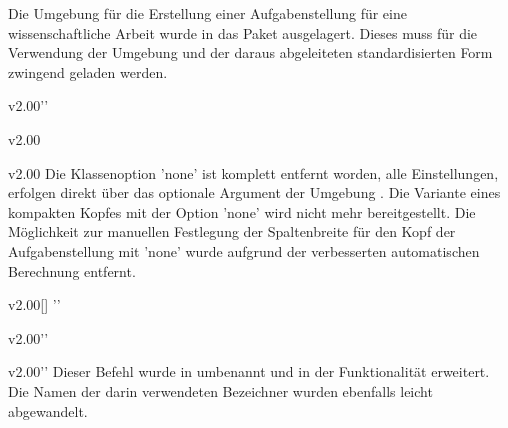 \minisec{\taskname}
%
\begin{Entity}{}
Die Umgebung für die Erstellung einer Aufgabenstellung für eine 
wissenschaftliche Arbeit wurde in das Paket  
ausgelagert. Dieses muss für die Verwendung der Umgebung  
und der daraus abgeleiteten standardisierten Form zwingend geladen werden.

\begin{Obsolete}{v2.00}{}''
\begin{Obsolete}{v2.00}{}
\begin{Obsolete}{v2.00}{}
\printdeclarationlist%
%
Die Klassenoption 'none' ist komplett entfernt worden, alle 
Einstellungen, erfolgen direkt über das optionale Argument der Umgebung 
. Die Variante eines kompakten Kopfes mit der Option 
'none' wird nicht mehr bereitgestellt. Die Möglichkeit zur 
manuellen Festlegung der Spaltenbreite für den Kopf der Aufgabenstellung mit 
'none' wurde aufgrund der verbesserten automatischen 
Berechnung entfernt.
\end{Obsolete}
\end{Obsolete}
\end{Obsolete}

\begin{Obsolete}{v2.00}{[]}%
  ''
\begin{Obsolete}{v2.00}{}''
\begin{Obsolete}{v2.00}{}''
\printdeclarationlist%
%
Dieser Befehl wurde in  umbenannt und in der Funktionalität 
erweitert. Die Namen der darin verwendeten Bezeichner wurden ebenfalls leicht 
abgewandelt.
\end{Obsolete}
\end{Obsolete}
\end{Obsolete}


\end{Entity}
